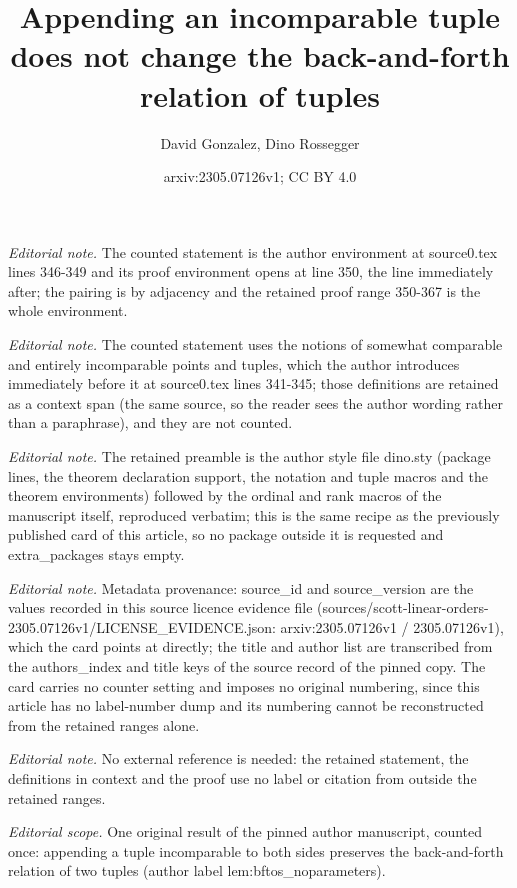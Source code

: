 \documentclass[10pt,a4paper]{amsart}
\title{Appending an incomparable tuple does not change the back-and-forth relation of tuples}
\author{David Gonzalez, Dino Rossegger}
\date{arxiv:2305.07126v1; CC BY 4.0}
\begin{document}
\maketitle
\noindent\textit{Editorial note.} The counted statement is the author environment at source0.tex lines 346-349 and its proof environment opens at line 350, the line immediately after; the pairing is by adjacency and the retained proof range 350-367 is the whole environment.\par\medskip
\noindent\textit{Editorial note.} The counted statement uses the notions of somewhat comparable and entirely incomparable points and tuples, which the author introduces immediately before it at source0.tex lines 341-345; those definitions are retained as a context span (the same source, so the reader sees the author wording rather than a paraphrase), and they are not counted.\par\medskip
\noindent\textit{Editorial note.} The retained preamble is the author style file dino.sty (package lines, the theorem declaration support, the notation and tuple macros and the theorem environments) followed by the ordinal and rank macros of the manuscript itself, reproduced verbatim; this is the same recipe as the previously published card of this article, so no package outside it is requested and extra\_packages stays empty.\par\medskip
\noindent\textit{Editorial note.} Metadata provenance: source\_id and source\_version are the values recorded in this source licence evidence file (sources/scott-linear-orders-2305.07126v1/LICENSE\_EVIDENCE.json: arxiv:2305.07126v1 / 2305.07126v1), which the card points at directly; the title and author list are transcribed from the authors\_index and title keys of the source record of the pinned copy. The card carries no counter setting and imposes no original numbering, since this article has no label-number dump and its numbering cannot be reconstructed from the retained ranges alone.\par\medskip
\noindent\textit{Editorial note.} No external reference is needed: the retained statement, the definitions in context and the proof use no label or citation from outside the retained ranges.\par\medskip
\noindent\textit{Editorial scope.} One original result of the pinned author manuscript, counted once: appending a tuple incomparable to both sides preserves the back-and-forth relation of two tuples (author label lem:bftos\_noparameters).\par\medskip
\end{document}
